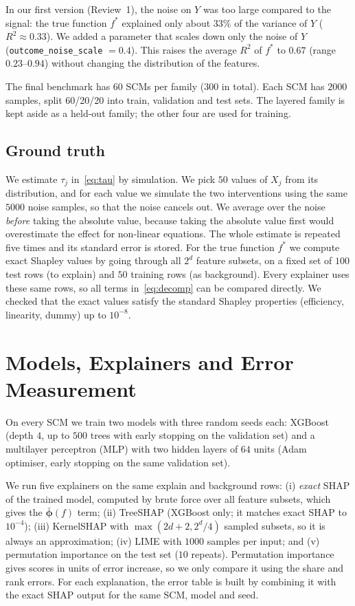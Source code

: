 In our first version (Review~1), the noise on $Y$ was too large compared to the signal: the true function $f^*$ explained only about $33\%$ of the variance of $Y$ ($R^2 \approx 0.33$). We added a parameter that scales down only the noise of $Y$ (\texttt{outcome\_noise\_scale} $=0.4$). This raises the average $R^2$ of $f^*$ to $0.67$ (range $0.23$--$0.94$) without changing the distribution of the features.

The final benchmark has $60$ SCMs per family ($300$ in total). Each SCM has $2000$ samples, split 60/20/20 into train, validation and test sets. The layered family is kept aside as a held-out family; the other four are used for training.

\subsection{Ground truth}
We estimate $\tau_j$ in~\eqref{eq:tau} by simulation. We pick $50$ values of $X_j$ from its distribution, and for each value we simulate the two interventions using the same $5000$ noise samples, so that the noise cancels out. We average over the noise \emph{before} taking the absolute value, because taking the absolute value first would overestimate the effect for non-linear equations. The whole estimate is repeated five times and its standard error is stored. For the true function $f^*$ we compute exact Shapley values by going through all $2^d$ feature subsets, on a fixed set of $100$ test rows (to explain) and $50$ training rows (as background). Every explainer uses these same rows, so all terms in~\eqref{eq:decomp} can be compared directly. We checked that the exact values satisfy the standard Shapley properties (efficiency, linearity, dummy) up to $10^{-8}$.

\section{Models, Explainers and Error Measurement}
On every SCM we train two models with three random seeds each: XGBoost~\cite{chen2016} (depth $4$, up to $500$ trees with early stopping on the validation set) and a multilayer perceptron (MLP) with two hidden layers of $64$ units (Adam optimiser, early stopping on the same validation set).

We run five explainers on the same explain and background rows: (i) \emph{exact} SHAP of the trained model, computed by brute force over all feature subsets, which gives the $\bar{\boldsymbol\phi}(f)$ term; (ii) TreeSHAP (XGBoost only; it matches exact SHAP to $10^{-4}$); (iii) KernelSHAP with $\max(2d+2, 2^d/4)$ sampled subsets, so it is always an approximation; (iv) LIME with $1000$ samples per input; and (v) permutation importance on the test set ($10$ repeats). Permutation importance gives scores in units of error increase, so we only compare it using the share and rank errors. For each explanation, the error table is built by combining it with the exact SHAP output for the same SCM, model and seed.

